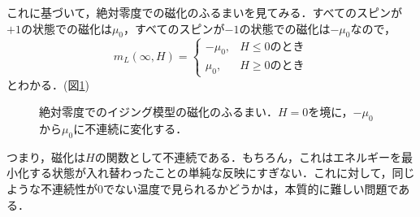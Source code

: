 \documentclass[a4paper,11pt]{jsreport}
\begin{document}
これに基づいて，絶対零度での磁化のふるまいを見てみる．すべてのスピンが$+1$の状態での磁化は$\mu_0$，すべてのスピンが$-1$の状態での磁化は$-\mu_0$なので，
\begin{equation}
  m_L(\infty, H) =
  \begin{cases}
    -\mu_0, & H \leq 0 \text{のとき} \\
    \mu_0,  & H \geq 0 \text{のとき}
  \end{cases}
\end{equation}
とわかる．(図\ref{絶対零度磁化})
\begin{figure}[h]
  \begin{center}
    \caption{絶対零度でのイジング模型の磁化のふるまい．$H=0$を境に，$-\mu_0$から$\mu_0$に不連続に変化する．\label{絶対零度磁化}}
  \end{center}
\end{figure}
つまり，磁化は$H$の関数として不連続である．もちろん，これはエネルギーを最小化する状態が入れ替わったことの単純な反映にすぎない．これに対して，同じような不連続性が$0$でない温度で見られるかどうかは，本質的に難しい問題である．
\end{document}
